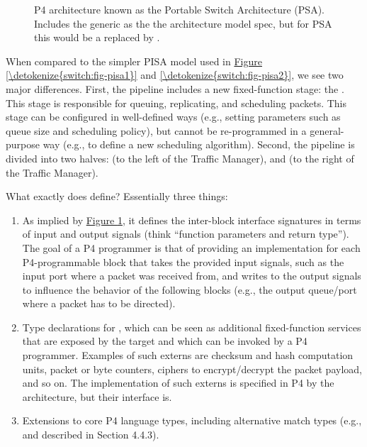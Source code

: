 \documentclass[letterpaper,11pt,english]{sphinxmanual}
\let\sphinxpxdimen\pdfpxdimen\else\newdimen\sphinxpxdimen
\begin{document}
\begin{figure}[htbp]
\centering
\capstart

\noindent\sphinxincludegraphics[width=650\sphinxpxdimen]{{Slide13}.png}
\caption{P4 architecture known as the Portable Switch Architecture
(PSA). Includes the generic  as the the architecture
model spec, but for PSA this would be a replaced by .}\label{\detokenize{switch:id13}}\label{\detokenize{switch:fig-psa}}\end{figure}

When compared to the simpler PISA model used in \hyperref[\detokenize{switch:fig-pisa1}]{Figure \ref{\detokenize{switch:fig-pisa1}}} and \hyperref[\detokenize{switch:fig-pisa2}]{\ref{\detokenize{switch:fig-pisa2}}}, we see two major
differences. First, the pipeline includes a new fixed-function stage:
the . This stage is responsible for queuing,
replicating, and scheduling packets. This stage can be configured in
well-defined ways (e.g., setting parameters such as queue size and
scheduling policy), but cannot be re-programmed in a general-purpose
way (e.g., to define a new scheduling algorithm). Second, the pipeline
is divided into two halves:  (to the left of the
Traffic Manager), and  (to the right of the Traffic
Manager).

What exactly does  define? Essentially three things:
\begin{enumerate}
\def\theenumi{\arabic{enumi}}
\def\labelenumi{\theenumi .}
\makeatletter\def\p@enumii{\p@enumi \theenumi .}\makeatother
\item {} 
As implied by \hyperref[\detokenize{switch:fig-psa}]{Figure \ref{\detokenize{switch:fig-psa}}}, it defines the
inter-block interface signatures in terms of input and output
signals (think “function parameters and return type”). The goal of
a P4 programmer is that of providing an implementation for each
P4-programmable block that takes the provided input signals, such
as the input port where a packet was received from, and writes to
the output signals to influence the behavior of the following
blocks (e.g., the output queue/port where a packet has to be
directed).

\item {} 
Type declarations for , which can be seen as additional
fixed-function services that are exposed by the target and which
can be invoked by a P4 programmer. Examples of such externs are
checksum and hash computation units, packet or byte counters,
ciphers to encrypt/decrypt the packet payload, and so on. The
implementation of such externs is  specified in P4 by the
architecture, but their interface is.

\item {} 
Extensions to core P4 language types, including alternative match
types (e.g.,  and  described in Section 4.4.3).

\end{enumerate}
\end{document}
